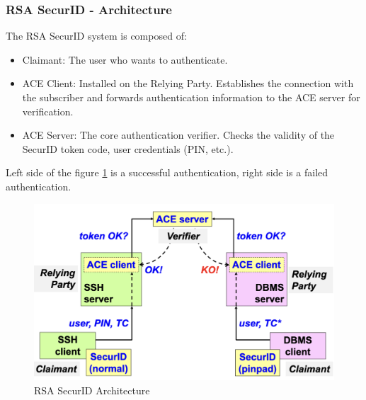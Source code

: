 \subsubsection*{RSA SecurID - Architecture}

The RSA SecurID system is composed of:
\begin{itemize}
    \item Claimant: The user who wants to authenticate.
    \item ACE Client: Installed on the Relying Party. Establishes the connection with the subscriber and forwards authentication information to the ACE server for verification.
    \item ACE Server: The core authentication verifier. Checks the validity of the SecurID token code, user credentials (PIN, etc.).
\end{itemize}
Left side of the figure \ref{fig:secarch} is a successful authentication, right side is a failed authentication.

\begin{figure}[H]
    \centering
    \includegraphics[width=0.5\linewidth]{Images/Authentication/secarch.png}
    \caption{RSA SecurID Architecture}
    \label{fig:secarch}
\end{figure}

